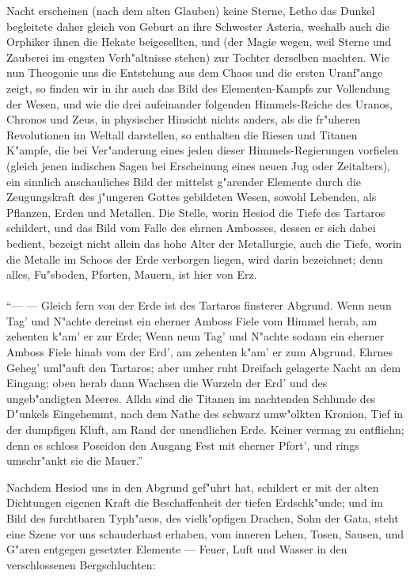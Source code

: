\documentclass[a4paper, 11pt, oneside, polutonikogreek, german]{article}
\begin{document}
\begin{enumerate}
Nacht erscheinen (nach dem alten Glauben) keine Sterne, Letho das Dunkel begleitete daher gleich von Geburt an ihre Schwester Asteria, weshalb auch die Orphiker ihnen die Hekate beigesellten, und (der Magie wegen, weil Sterne und Zauberei im engsten Verh"altnisse stehen) zur Tochter derselben machten. Wie nun Theogonie uns die Entstehung aus dem Chaos und die ersten Uranf"ange zeigt, so finden wir in ihr auch das Bild des Elementen-Kampfs zur Vollendung der Wesen, und wie die drei aufeinander folgenden Himmels-Reiche des Uranos, Chronos und Zeus, in physischer Hinsicht nichts anders, als die fr"uheren Revolutionen im Weltall darstellen, so enthalten die Riesen und Titanen K"ampfe, die bei Ver"anderung eines jeden dieser Himmels-Regierungen vorfielen (gleich jenen indischen Sagen bei Erscheinung eines neuen Jug oder Zeitalters), ein sinnlich anschauliches Bild der mittelst g"arender Elemente durch die Zeugungskraft des j"ungeren Gottes gebildeten Wesen, sowohl Lebenden, als Pflanzen, Erden und Metallen. Die Stelle, worin Hesiod die Tiefe des Tartaros schildert, und das Bild vom Falle des ehrnen Ambosses, dessen er sich dabei bedient, bezeigt nicht allein das hohe Alter der Metallurgie, auch die Tiefe, worin die Metalle im Schoos der Erde verborgen liegen, wird darin bezeichnet; denn alles, Fu"sboden, Pforten, Mauern, ist hier von Erz.
\end{enumerate}
\paragraph{}
"`--- --- Gleich fern von der Erde ist des Tartaros finsterer Abgrund. Wenn neun Tag' und N"achte dereinst ein eherner Amboss Fiele vom Himmel herab, am zehenten k"am' er zur Erde; Wenn neun Tag' und N"achte sodann ein eherner Amboss Fiele hinab vom der Erd', am zehenten k"am' er zum Abgrund. Ehrnes Geheg' uml"auft den Tartaros; aber umher ruht Dreifach gelagerte Nacht an dem Eingang; oben herab dann Wachsen die Wurzeln der Erd' und des ungeb"andigten Meeres. Allda sind die Titanen im nachtenden Schlunde des D"unkels Eingehemmt, nach dem Nathe des schwarz umw"olkten Kronion, Tief in der dumpfigen Kluft, am Rand der unendlichen Erde. Keiner vermag zu entfliehn; denn es schloss Poseidon den Ausgang Fest mit eherner Pfort', und rings umschr"ankt sie die Mauer."'

Nachdem Hesiod uns in den Abgrund gef"uhrt hat, schildert er mit der alten Dichtungen eigenen Kraft die Beschaffenheit der tiefen Erdschk"unde; und im Bild des furchtbaren Typh"aeos, des vielk"opfigen Drachen, Sohn der Gata, steht eine Szene vor uns schauderhast erhaben, vom inneren Lehen, Tosen, Sausen, und G"aren entgegen gesetzter Elemente --- Feuer, Luft und Wasser in den verschlossenen Bergschluchten:
\end{document}
